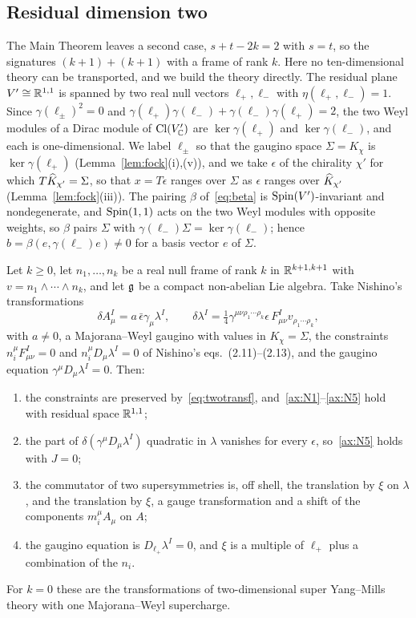 \subsection{Residual dimension two}
\label{ssec:residualtwo}

The Main Theorem leaves a second case, $s+t-2k=2$ with $s=t$, so the signatures $(k+1)+(k+1)$ with a frame of rank $k$. Here no ten-dimensional theory can be transported, and we build the theory directly. The residual plane $V'\cong\mathbb{R}^{1,1}$ is spanned by two real null vectors $\ell_+,\ell_-$ with $\eta(\ell_+,\ell_-)=1$. Since $\gamma(\ell_\pm)^2=0$ and $\gamma(\ell_+)\gamma(\ell_-)+\gamma(\ell_-)\gamma(\ell_+)=2$, the two Weyl modules of a Dirac module of $\operatorname{Cl}(V'_{\mathbb{C}})$ are $\ker\gamma(\ell_+)$ and $\ker\gamma(\ell_-)$, and each is one-dimensional. We label $\ell_\pm$ so that the gaugino space $\Sigma=K_\chi$ is $\ker\gamma(\ell_+)$ (Lemma~\ref{lem:fock}(i),(v)), and we take $\epsilon$ of the chirality $\chi'$ for which $T\widehat{K}_{\chi'}=\Sigma$, so that $x=T\epsilon$ ranges over $\Sigma$ as $\epsilon$ ranges over $\widehat{K}_{\chi'}$ (Lemma~\ref{lem:fock}(iii)). The pairing $\beta$ of~\eqref{eq:beta} is $\operatorname{Spin}(V')$-invariant and nondegenerate, and $\operatorname{Spin}(1,1)$ acts on the two Weyl modules with opposite weights, so $\beta$ pairs $\Sigma$ with $\gamma(\ell_-)\Sigma=\ker\gamma(\ell_-)$; hence $b=\beta(e,\gamma(\ell_-)e)\ne0$ for a basis vector $e$ of $\Sigma$.

\begin{theorem}
\label{thm:residualtwo}
Let $k\ge0$, let $n_1,\dots,n_k$ be a real null frame of rank $k$ in $\mathbb{R}^{k+1,k+1}$ with $v=n_1\wedge\cdots\wedge n_k$, and let $\mathfrak{g}$ be a compact non-abelian Lie algebra. Take Nishino's transformations
\begin{equation}
\label{eq:twotransf}
\delta A^I_\mu=a\,\bar\epsilon\gamma_\mu\lambda^I,\qquad \delta\lambda^I=\tfrac14\gamma^{\mu\nu\rho_1\cdots\rho_k}\epsilon\,F^I_{\mu\nu}v_{\rho_1\cdots\rho_k},
\end{equation}
with $a\ne0$, a Majorana--Weyl gaugino with values in $K_\chi=\Sigma$, the constraints $n_i^\mu F^I_{\mu\nu}=0$ and $n_i^\mu D_\mu\lambda^I=0$ of Nishino's eqs.~(2.11)--(2.13), and the gaugino equation $\gamma^\mu D_\mu\lambda^I=0$. Then:
\begin{enumerate}[label=(\roman*)]
\item the constraints are preserved by~\eqref{eq:twotransf}, and~\ref{ax:N1}--\ref{ax:N5} hold with residual space $\mathbb{R}^{1,1}$;
\item the part of $\delta(\gamma^\mu D_\mu\lambda^I)$ quadratic in $\lambda$ vanishes for every $\epsilon$, so~\ref{ax:N5} holds with $J=0$;
\item the commutator of two supersymmetries is, off shell, the translation by $\xi$ on $\lambda$, and the translation by $\xi$, a gauge transformation and a shift of the components $m_i^\mu A_\mu$ on $A$;
\item the gaugino equation is $D_{\ell_+}\lambda^I=0$, and $\xi$ is a multiple of $\ell_+$ plus a combination of the $n_i$.
\end{enumerate}
For $k=0$ these are the transformations of two-dimensional super Yang--Mills theory with one Majorana--Weyl supercharge.
\end{theorem}

